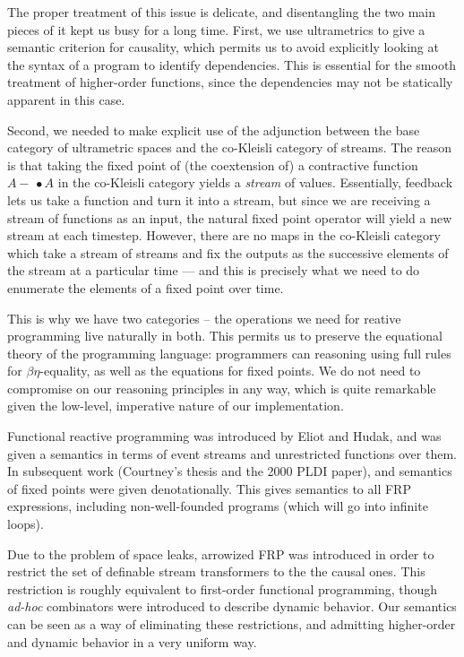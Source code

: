 \documentclass[preprint]{sigplanconf}
\newcommand{\lollishrink}{-\!\!\!\,\bullet}
\begin{document}
The proper treatment of this issue is delicate, and disentangling the
two main pieces of it kept us busy for a long time. First, we use
ultrametrics to give a semantic criterion for causality, which permits
us to avoid explicitly looking at the syntax of a program to identify
dependencies. This is essential for the smooth treatment of
higher-order functions, since the dependencies may not be statically
apparent in this case.

Second, we needed to make explicit use of the adjunction between the
base category of ultrametric spaces and the co-Kleisli category of
streams. The reason is that taking the fixed point of (the coextension
of) a contractive function $A \lollishrink A$ in the co-Kleisli
category yields a \emph{stream} of values. Essentially, feedback lets
us take a function and turn it into a stream, but since we are
receiving a stream of functions as an input, the natural fixed point
operator will yield a new stream at each timestep.  However, there are
no maps in the co-Kleisli category which take a stream of streams and
fix the outputs as the successive elements of the stream at a
particular time --- and this is precisely what we need to do enumerate
the elements of a fixed point over time.

This is why we have two categories -- the operations we need for
reative programming live naturally in both. This permits us to
preserve the equational theory of the programming language:
programmers can reasoning using full rules for $\beta\eta$-equality,
as well as the equations for fixed points. We do not need to
compromise on our reasoning principles in any way, which is quite
remarkable given the low-level, imperative nature of our
implementation.

Functional reactive programming was introduced by Eliot and Hudak, and
was given a semantics in terms of event streams and unrestricted
functions over them. In subsequent work (Courtney's thesis and the
2000 PLDI paper), and semantics of fixed points were given
denotationally. This gives semantics to all FRP expressions, including
non-well-founded programs (which will go into infinite loops).

Due to the problem of space leaks, arrowized FRP was introduced in
order to restrict the set of definable stream transformers to the the
causal ones. This restriction is roughly equivalent to first-order
functional programming, though \emph{ad-hoc} combinators were
introduced to describe dynamic behavior. Our semantics can be seen as
a way of eliminating these restrictions, and admitting higher-order
and dynamic behavior in a very uniform way.
\end{document}
